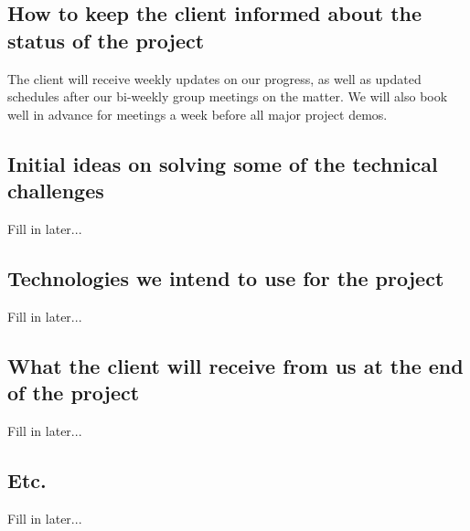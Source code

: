 \documentclass[12pt, oneside]{article}
\begin{document}
	\subsection{How to keep the client informed about the status of the project}
		The client will receive weekly updates on our progress, as well as updated schedules after our bi-weekly group meetings on the matter.
		We will also book well in advance for meetings a week before all major project demos.
		
	\subsection{Initial ideas on solving some of the technical challenges}
		Fill in later...
	\subsection{Technologies we intend to use for the project}
		Fill in later...
	\subsection{What the client will receive from us at the end of the project}
		Fill in later...
	\subsection{Etc.}
		Fill in later...
\end{document}
